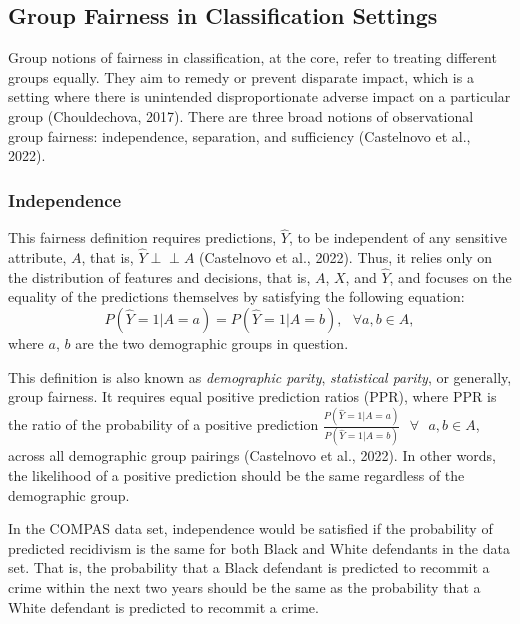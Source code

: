 \documentclass[12pt, twoside]{amherstthesis}
\begin{document}
\hypertarget{group-fairness-in-classification-settings}{%
\subsection{Group Fairness in Classification Settings}\label{group-fairness-in-classification-settings}}

Group notions of fairness in classification, at the core, refer to treating different groups equally. They aim to remedy or prevent disparate impact, which is a setting where there is unintended disproportionate adverse impact on a particular group (Chouldechova, 2017). There are three broad notions of observational group fairness: independence, separation, and sufficiency (Castelnovo et al., 2022).

\hypertarget{independence}{%
\subsubsection{Independence}\label{independence}}

\newcommand{\indep}{\perp \!\!\! \perp}

This fairness definition requires predictions, \(\hat{Y}\), to be independent of any sensitive attribute, \(A\), that is, \(\hat{Y} \perp \!\!\! \perp A\) (Castelnovo et al., 2022). Thus, it relies only on the distribution of features and decisions, that is, \(A\), \(X\), and \(\hat{Y}\), and focuses on the equality of the predictions themselves by satisfying the following equation:
\begin{equation}
\label{ch1eq3}
P (\hat{Y} = 1 | A = a) = P (\hat{Y} = 1 | A = b), \text{    } \forall a, b \in A,
\end{equation}
where \(a\), \(b\) are the two demographic groups in question.

This definition is also known as \emph{demographic parity}, \emph{statistical parity}, or generally, group fairness. It requires equal positive prediction ratios (PPR), where PPR is the ratio of the probability of a positive prediction \(\frac{P(\hat{Y} = 1 | A = a)}{P(\hat{Y} = 1 | A = b)} \text{ } \forall \text{ } a, b \in A\), across all demographic group pairings (Castelnovo et al., 2022). In other words, the likelihood of a positive prediction should be the same regardless of the demographic group.

In the COMPAS data set, independence would be satisfied if the probability of predicted recidivism is the same for both Black and White defendants in the data set. That is, the probability that a Black defendant is predicted to recommit a crime within the next two years should be the same as the probability that a White defendant is predicted to recommit a crime.
\end{document}
